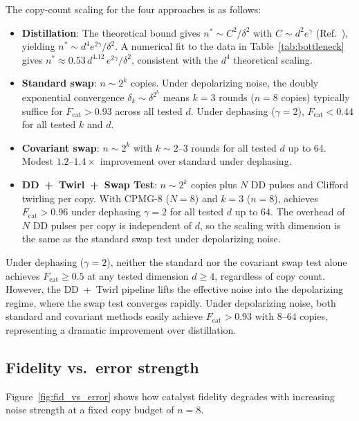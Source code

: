 \documentclass[prx,twocolumn,superscriptaddress,longbibliography,floatfix]{revtex4-2}
\begin{document}
The copy-count scaling for the four approaches is as follows:
\begin{itemize}
\item \textbf{Distillation}: The theoretical bound gives $n^* \sim C^2/\delta^2$ with $C \sim d^2 e^{\gamma}$ (Ref.~\cite{Shiraishi2024}), yielding $n^* \sim d^4 e^{2\gamma}/\delta^2$.  A numerical fit to the data in Table~\ref{tab:bottleneck} gives $n^* \approx 0.53\, d^{4.12}\, e^{2\gamma}/\delta^2$, consistent with the $d^4$ theoretical scaling.
\item \textbf{Standard swap}: $n \sim 2^{k}$ copies.  Under depolarizing noise, the doubly exponential convergence $\delta_k \sim \delta^{2^k}$ means $k = 3$ rounds ($n = 8$ copies) typically suffice for $F_\mathrm{cat} > 0.93$ across all tested $d$.  Under dephasing ($\gamma = 2$), $F_\mathrm{cat} < 0.44$ for all tested $k$ and $d$.
\item \textbf{Covariant swap}: $n \sim 2^k$ with $k \sim 2$--$3$ rounds for all tested $d$ up to 64. Modest $1.2$--$1.4\times$ improvement over standard under dephasing.
\item \textbf{DD~+~Twirl~+~Swap Test}: $n \sim 2^k$ copies plus $N$ DD pulses and Clifford twirling per copy. With CPMG-8 ($N = 8$) and $k = 3$ ($n = 8$), achieves $F_\mathrm{cat} > 0.96$ under dephasing $\gamma = 2$ for all tested $d$ up to 64. The overhead of $N$ DD pulses per copy is independent of $d$, so the scaling with dimension is the same as the standard swap test under depolarizing noise.
\end{itemize}

Under dephasing ($\gamma = 2$), neither the standard nor the covariant swap test alone achieves $F_\mathrm{cat} \geq 0.5$ at any tested dimension $d \geq 4$, regardless of copy count.
However, the DD~+~Twirl pipeline lifts the effective noise into the depolarizing regime, where the swap test converges rapidly.
Under depolarizing noise, both standard and covariant methods easily achieve $F_\mathrm{cat} > 0.93$ with 8--64 copies, representing a dramatic improvement over distillation.


\subsection{Fidelity vs.\ error strength}
\label{sec:fid_vs_error}

Figure~\ref{fig:fid_vs_error} shows how catalyst fidelity degrades with increasing noise strength at a fixed copy budget of $n = 8$.
\end{document}
